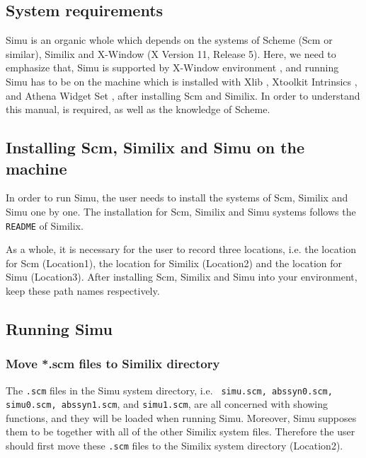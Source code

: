 \begin{sloppypar}
\subsection{System requirements}


Simu is an organic whole which depends on the systems of Scheme (Scm
or similar), Similix \cite{Bondorf:93:manual} and X-Window (X Version
11, Release 5).  Here, we need to emphasize that, Simu is supported by
X-Window environment \cite{Mikes:92}, and running Simu has to be on
the machine which is installed with Xlib
\cite{ScheiflerGettys:90,GettysScheifler:91}, Xtoolkit Intrinsics
\cite{AsenteSwick:90,McCormackAsenteSwick:91}, and Athena Widget Set
\cite{Peterson:91}, after installing Scm and Similix. In order to
understand this manual, \cite{Bondorf:93:manual} is required, as well
as the knowledge of Scheme.


\subsection{Installing Scm, Similix and Simu on the machine}


In order to run Simu, the user needs to install the systems of Scm,
Similix and Simu one by one.  The installation for Scm, Similix and
Simu systems follows the {\tt README} of Similix.

As a whole, it is necessary for the user to record three locations,
i.e. the location for Scm (Location1), the location for Similix
(Location2) and the location for Simu (Location3). After installing
Scm, Similix and Simu into your environment, keep these path names
respectively.


\subsection{Running Simu}

\subsubsection{Move *.scm files to Similix directory}

The {\tt *.scm} files in the Simu system directory, i.e. {\tt
simu.scm, abssyn0.scm, simu0.scm, abssyn1.scm}, and {\tt simu1.scm},
are all concerned with showing functions, and they will be loaded when
running Simu.  Moreover, Simu supposes them to be together with all of
the other Similix system files. Therefore the user should first move
these {\tt *.scm} files to the Similix system directory (Location2).


\end{sloppypar}
